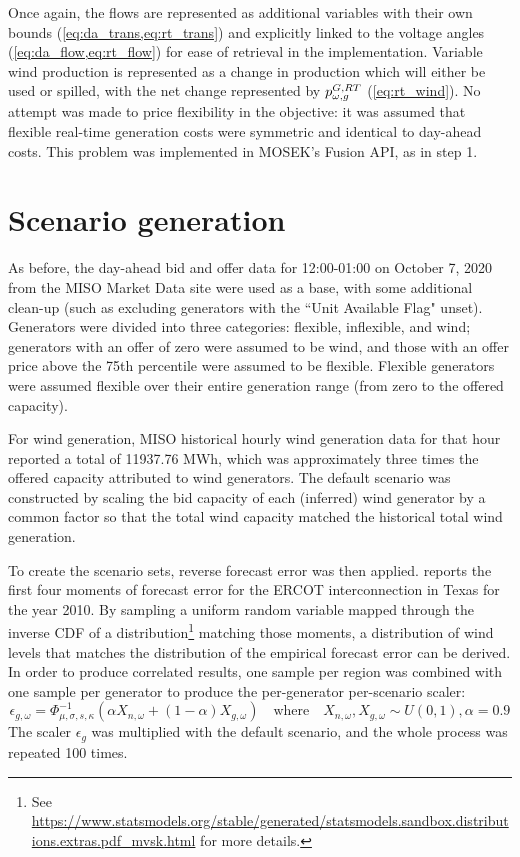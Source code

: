 \documentclass[11pt,a4paper]{article}
\numberwithin{equation}{section}
\begin{document}
Once again, the flows are represented as additional variables with their own bounds (\cref{eq:da_trans,eq:rt_trans}) and explicitly linked to the voltage angles (\cref{eq:da_flow,eq:rt_flow}) for ease of retrieval in the implementation.
Variable wind production is represented as a change in production which will either be used or spilled, with the net change represented by $p^{G,RT}_{\omega,g}$ (\cref{eq:rt_wind}).
No attempt was made to price flexibility in the objective: it was assumed that flexible real-time generation costs were symmetric and identical to day-ahead costs.
This problem was implemented in MOSEK's Fusion API, as in step 1.

\section{Scenario generation}
\label{sec:scenario}

As before, the day-ahead bid and offer data for 12:00-01:00 on October 7, 2020 from the MISO Market Data site \cite{MISOMarketData} were used as a base, with some additional clean-up (such as excluding generators with the ``Unit Available Flag" unset).
Generators were divided into three categories: flexible, inflexible, and wind; generators with an offer of zero were assumed to be wind, and those with an offer price above the 75th percentile were assumed to be flexible.
Flexible generators were assumed flexible over their entire generation range (from zero to the offered capacity).

For wind generation, MISO historical hourly wind generation data for that hour reported a total of 11937.76 MWh, which was approximately three times the offered capacity attributed to wind generators.
The default scenario was constructed by scaling the bid capacity of each (inferred) wind generator by a common factor so that the total wind capacity matched the historical total wind generation.

To create the scenario sets, reverse forecast error was then applied. 
\cite{hodgeWindPowerForecasting2012} reports the first four moments of forecast error for the ERCOT interconnection in Texas for the year 2010.
By sampling a uniform random variable mapped through the inverse CDF of a distribution\footnote{
See \url{https://www.statsmodels.org/stable/generated/statsmodels.sandbox.distributions.extras.pdf_mvsk.html} for more details.
} matching those moments, a distribution of wind levels that matches the distribution of the empirical forecast error can be derived. 
In order to produce correlated results, one sample per region was combined with one sample per generator to produce the per-generator per-scenario scaler:
\begin{equation}
\epsilon_{g,\omega} = \Phi^{-1}_{\mu,\sigma,s,\kappa} \left( \alpha X_{n,\omega} + (1 - \alpha) X_{g,\omega} \right) \quad \text{where} \quad X_{n,\omega}, X_{g,\omega} \sim U(0,1), \alpha=0.9
\end{equation}
The scaler $\epsilon_g$ was multiplied with the default scenario, and the whole process was repeated 100 times.
\end{document}
